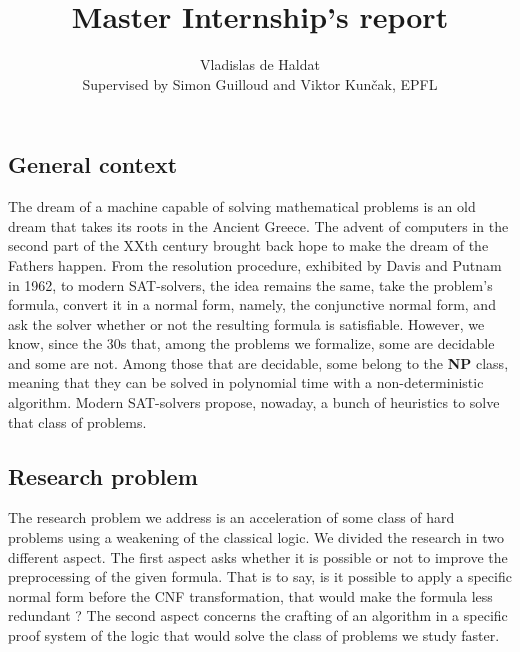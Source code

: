 \documentclass[a4paper, 11pt]{article}
\title{Master Internship's report}
\author{Vladislas de Haldat\\\small{Supervised by Simon Guilloud and Viktor Kunčak, EPFL}}
\begin{document}
    \maketitle

	\subsection*{General context}
	The dream of a machine capable of solving mathematical problems is an old dream that takes its
	roots in the Ancient Greece. The advent of computers in the second part of the XXth century
	brought back hope to make the dream of the Fathers happen. From the resolution procedure, 
	exhibited
	by Davis and Putnam in 1962, to modern SAT-solvers, the idea remains the same, take the
	problem's formula, convert it in a normal form, namely, the conjunctive normal form, and ask
	the solver whether or not the resulting formula is satisfiable. However, we know, since the 30s 
	that, among the problems we formalize, some are decidable and some are not. Among those that are
	decidable, some belong to the \textbf{NP} class, meaning that they can be solved in polynomial
	time with a non-deterministic algorithm. Modern SAT-solvers propose, nowaday, a bunch of 
	heuristics to solve that class of problems.


	\subsection*{Research problem}

	The research problem we address is an acceleration of some class of hard problems using a
	weakening of the classical logic. We divided the research in two different aspect. 
	The first aspect asks whether it is possible or not to improve the preprocessing of the given
	formula. That is to say, is it possible to apply a specific normal form before the CNF
	transformation, that would make the formula less redundant ? The second
	aspect concerns the crafting of an algorithm in a specific proof system of the logic that
	would solve the class of problems we study faster.

\end{document}
